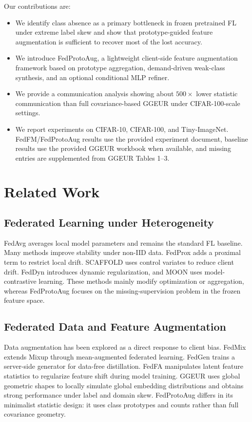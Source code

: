 ﻿\documentclass[conference]{IEEEtran}
\newcommand{\method}{FedProtoAug}
\begin{document}
Our contributions are:
\begin{itemize}
    \item We identify class absence as a primary bottleneck in frozen pretrained FL under extreme label skew and show that prototype-guided feature augmentation is sufficient to recover most of the lost accuracy.
    \item We introduce \method, a lightweight client-side feature augmentation framework based on prototype aggregation, demand-driven weak-class synthesis, and an optional conditional MLP refiner.
    \item We provide a communication analysis showing about $500\times$ lower statistic communication than full covariance-based GGEUR under CIFAR-100-scale settings.
    \item We report experiments on CIFAR-10, CIFAR-100, and Tiny-ImageNet. FedFM/FedProtoAug results use the provided experiment document, baseline results use the provided GGEUR workbook when available, and missing entries are supplemented from GGEUR Tables 1--3.
\end{itemize}

\section{Related Work}

\subsection{Federated Learning under Heterogeneity}
FedAvg \cite{mcmahan2017fedavg} averages local model parameters and remains the standard FL baseline. Many methods improve stability under non-IID data. FedProx \cite{li2020fedprox} adds a proximal term to restrict local drift. SCAFFOLD \cite{karimireddy2020scaffold} uses control variates to reduce client drift. FedDyn \cite{acar2021feddyn} introduces dynamic regularization, and MOON \cite{li2021moon} uses model-contrastive learning. These methods mainly modify optimization or aggregation, whereas \method{} focuses on the missing-supervision problem in the frozen feature space.

\subsection{Federated Data and Feature Augmentation}
Data augmentation has been explored as a direct response to client bias. FedMix \cite{yoon2021fedmix} extends Mixup through mean-augmented federated learning. FedGen \cite{zhu2021fedgen} trains a server-side generator for data-free distillation. FedFA \cite{zhou2023fedfa} manipulates latent feature statistics to regularize feature shift during model training. GGEUR \cite{ma2025ggeur} uses global geometric shapes to locally simulate global embedding distributions and obtains strong performance under label and domain skew. \method{} differs in its minimalist statistic design: it uses class prototypes and counts rather than full covariance geometry.
\end{document}

